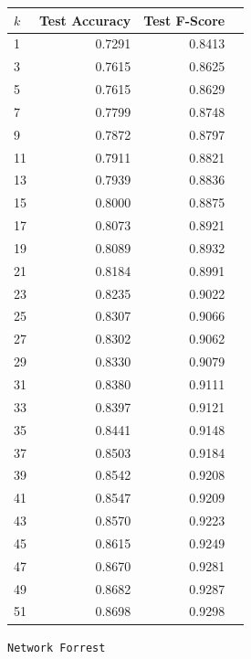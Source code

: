 \documentclass{article}
\begin{document}
\begin{minipage}{0.49\textwidth}
    \centering
    \vfill
    \begin{tabular}{lrrr}
        \toprule
        $k$ & Test Accuracy & Test F-Score \\
        \midrule
        1 & {0.7291} & {0.8413} \\
        3 & {0.7615} & {0.8625} \\
        5 & {0.7615} & {0.8629} \\
        7 & {0.7799} & {0.8748} \\
        9 & {0.7872} & {0.8797} \\
        11 & {0.7911} & {0.8821} \\
        13 & {0.7939} & {0.8836} \\
        15 & {0.8000} & {0.8875} \\
        17 & {0.8073} & {0.8921} \\
        19 & {0.8089} & {0.8932} \\
        21 & {0.8184} & {0.8991} \\
        23 & {0.8235} & {0.9022} \\
        25 & {0.8307} & {0.9066} \\
        27 & {0.8302} & {0.9062} \\
        29 & {0.8330} & {0.9079} \\
        31 & {0.8380} & {0.9111} \\
        33 & {0.8397} & {0.9121} \\
        35 & {0.8441} & {0.9148} \\
        37 & {0.8503} & {0.9184} \\
        39 & {0.8542} & {0.9208} \\
        41 & {0.8547} & {0.9209} \\
        43 & {0.8570} & {0.9223} \\
        45 & {0.8615} & {0.9249} \\
        47 & {0.8670} & {0.9281} \\
        49 & {0.8682} & {0.9287} \\
        51 & {0.8698} & {0.9298} \\
        \bottomrule
    \end{tabular}
    \vfill
\end{minipage}
\restoregeometry
\begin{center}
    \texttt{Network Forrest}
\end{center}
\end{document}
